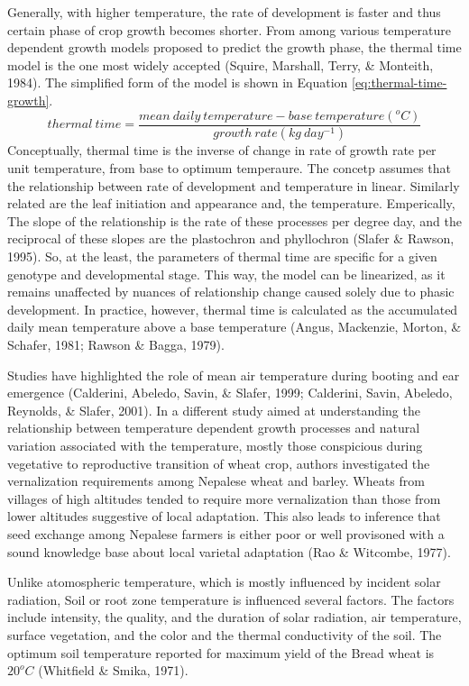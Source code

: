 \documentclass[12pt,oneside]{dukestatscithesis} %
\theoremstyle{definition}
\theoremstyle{definition}
\theoremstyle{definition}
\theoremstyle{remark}
\begin{document}
Generally, with higher temperature, the rate of development is faster
and thus certain phase of crop growth becomes shorter. From among
various temperature dependent growth models proposed to predict the
growth phase, the thermal time model is the one most widely accepted
(Squire, Marshall, Terry, \& Monteith, 1984). The simplified form of the
model is shown in Equation \eqref{eq:thermal-time-growth}.
\begin{equation}
thermal\ time = \frac{mean\ daily\ temperature - base\ temperature(^oC)}{growth\ rate(kg\ day^{-1})}
\label{eq:thermal-time-growth}
\end{equation}
Conceptually, thermal time is the inverse of change in rate of growth
rate per unit temperature, from base to optimum temperaure. The concetp
assumes that the relationship between rate of development and
temperature in linear. Similarly related are the leaf initiation and
appearance and, the temperature. Emperically, The slope of the
relationship is the rate of these processes per degree day, and the
reciprocal of these slopes are the plastochron and phyllochron (Slafer
\& Rawson, 1995). So, at the least, the parameters of thermal time are
specific for a given genotype and developmental stage. This way, the
model can be linearized, as it remains unaffected by nuances of
relationship change caused solely due to phasic development. In
practice, however, thermal time is calculated as the accumulated daily
mean temperature above a base temperature (Angus, Mackenzie, Morton, \&
Schafer, 1981; Rawson \& Bagga, 1979).

Studies have highlighted the role of mean air temperature during booting
and ear emergence (Calderini, Abeledo, Savin, \& Slafer, 1999;
Calderini, Savin, Abeledo, Reynolds, \& Slafer, 2001). In a different
study aimed at understanding the relationship between temperature
dependent growth processes and natural variation associated with the
temperature, mostly those conspicious during vegetative to reproductive
transition of wheat crop, authors investigated the vernalization
requirements among Nepalese wheat and barley. Wheats from villages of
high altitudes tended to require more vernalization than those from
lower altitudes suggestive of local adaptation. This also leads to
inference that seed exchange among Nepalese farmers is either poor or
well provisoned with a sound knowledge base about local varietal
adaptation (Rao \& Witcombe, 1977).

Unlike atomospheric temperature, which is mostly influenced by incident
solar radiation, Soil or root zone temperature is influenced several
factors. The factors include intensity, the quality, and the duration of
solar radiation, air temperature, surface vegetation, and the color and
the thermal conductivity of the soil. The optimum soil temperature
reported for maximum yield of the Bread wheat is \(20^oC\) (Whitfield \&
Smika, 1971).
\end{document}
